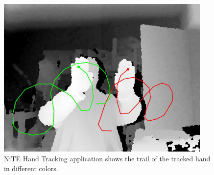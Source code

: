 \begin{figure}
	\centering 
	\includegraphics[height=8cm]{figures/content/ni-hand.jpg} \caption{NiTE Hand Tracking application shows the trail of the tracked hand in different colors. \cite{12} } \label{fg:ni:hand} 
\end{figure}
